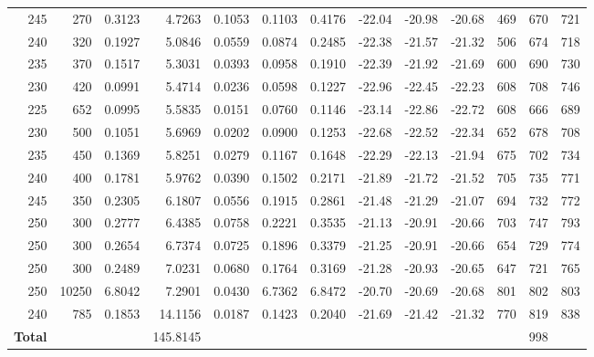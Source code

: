 {\begin{landscape}
\begin{longtable}{r r r r r r r r r r r r r}
245 & 270 & 0.3123 & 4.7263 & 0.1053 & 0.1103 & 0.4176 & -22.04 & -20.98 & -20.68 & 469 & 670 & 721 \\
240 & 320 & 0.1927 & 5.0846 & 0.0559 & 0.0874 & 0.2485 & -22.38 & -21.57 & -21.32 & 506 & 674 & 718 \\
235 & 370 & 0.1517 & 5.3031 & 0.0393 & 0.0958 & 0.1910 & -22.39 & -21.92 & -21.69 & 600 & 690 & 730 \\
230 & 420 & 0.0991 & 5.4714 & 0.0236 & 0.0598 & 0.1227 & -22.96 & -22.45 & -22.23 & 608 & 708 & 746 \\
225 & 652 & 0.0995 & 5.5835 & 0.0151 & 0.0760 & 0.1146 & -23.14 & -22.86 & -22.72 & 608 & 666 & 689 \\
230 & 500 & 0.1051 & 5.6969 & 0.0202 & 0.0900 & 0.1253 & -22.68 & -22.52 & -22.34 & 652 & 678 & 708 \\
235 & 450 & 0.1369 & 5.8251 & 0.0279 & 0.1167 & 0.1648 & -22.29 & -22.13 & -21.94 & 675 & 702 & 734 \\
240 & 400 & 0.1781 & 5.9762 & 0.0390 & 0.1502 & 0.2171 & -21.89 & -21.72 & -21.52 & 705 & 735 & 771 \\
245 & 350 & 0.2305 & 6.1807 & 0.0556 & 0.1915 & 0.2861 & -21.48 & -21.29 & -21.07 & 694 & 732 & 772 \\
250 & 300 & 0.2777 & 6.4385 & 0.0758 & 0.2221 & 0.3535 & -21.13 & -20.91 & -20.66 & 703 & 747 & 793 \\
250 & 300 & 0.2654 & 6.7374 & 0.0725 & 0.1896 & 0.3379 & -21.25 & -20.91 & -20.66 & 654 & 729 & 774 \\
250 & 300 & 0.2489 & 7.0231 & 0.0680 & 0.1764 & 0.3169 & -21.28 & -20.93 & -20.65 & 647 & 721 & 765 \\
250 & 10250 & 6.8042 & 7.2901 & 0.0430 & 6.7362 & 6.8472 & -20.70 & -20.69 & -20.68 & 801 & 802 & 803 \\
240 & 785 & 0.1853 & 14.1156 & 0.0187 & 0.1423 & 0.2040 & -21.69 & -21.42 & -21.32 & 770 & 819 & 838 \\
\midrule
\textbf{Total} &  &  & 145.8145 &  &  &  &  &  &  &  & 998 &  \\
\end{longtable}
\end{landscape}
}

